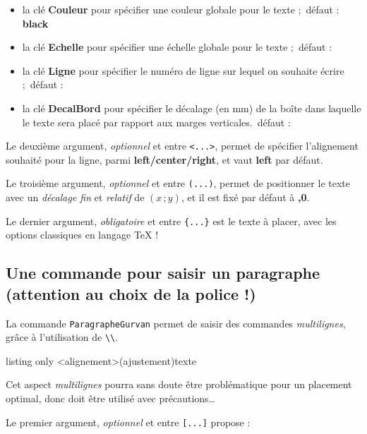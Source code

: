 \documentclass[a4paper]{article}
\newcommand\Cle[1]{{\bfseries\sffamily\textlangle #1\textrangle}}
\begin{document}
\begin{itemize}
	\item la clé \Cle{Couleur} pour spécifier une couleur globale pour le texte ;\hfill~défaut : \Cle{black}
	\item la clé \Cle{Echelle} pour spécifier une échelle globale pour le texte ;\hfill~défaut : \Cle{1}
	\item la clé \Cle{Ligne} pour spécifier le numéro de ligne sur lequel on souhaite écrire ;\hfill~défaut : \Cle{1}
	\item la clé \Cle{DecalBord} pour spécifier le décalage (en mm) de la boîte dans laquelle le texte sera placé par rapport aux marges verticales.\hfill~défaut : \Cle{0}
\end{itemize}

Le deuxième argument, \textit{optionnel} et entre \texttt{<...>}, permet de spécifier l'alignement souhaité pour la ligne, parmi \Cle{left/center/right}, et vaut \Cle{left} par défaut.

\smallskip

Le troisième argument, \textit{optionnel} et entre \texttt{(...)}, permet de positionner le texte avec un \textit{décalage fin} et \textit{relatif} de $(x\,;y)$, et il est fixé par défaut à \Cle{0,0}.

\smallskip

Le dernier argument, \textit{obligatoire} et entre \texttt{\{...\}} est le texte à placer, avec les options classiques en langage \TeX{} !

\pagebreak

\subsection{Une commande pour saisir un paragraphe (attention au choix de la police !)}

La commande \texttt{ParagrapheGurvan} permet de saisir des commandes \textit{multilignes}, grâce à l'utilisation de \texttt{\textbackslash\textbackslash}.

\begin{PresentationCode}{listing only}
\ParagrapheGurvan[options]<alignement>(ajustement){texte}
\end{PresentationCode}

\faBomb{} Cet aspect \textit{multilignes} pourra sans doute être problématique pour un placement optimal, donc doit être utilisé avec précautions\ldots

\smallskip

Le premier argument, \textit{optionnel} et entre \texttt{[...]} propose :
\end{document}
